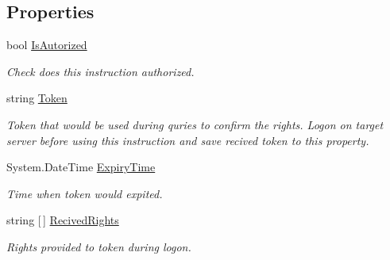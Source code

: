 \subsection*{Properties}
\begin{DoxyCompactItemize}
\item 
bool \mbox{\hyperlink{class_uniform_queries_1_1_executable_1_1_security_1_1_auth_query_processor_ab77106e3aee595bb89634690bec88d9f}{Is\+Autorized}}
\begin{DoxyCompactList}\small\item\em Check does this instruction authorized. \end{DoxyCompactList}\item 
string \mbox{\hyperlink{class_uniform_queries_1_1_executable_1_1_security_1_1_auth_query_processor_aef3e0af13be8f2e30f3ae95a9e8b58bb}{Token}}
\begin{DoxyCompactList}\small\item\em Token that would be used during quries to confirm the rights. Logon on target server before using this instruction and save recived token to this property. \end{DoxyCompactList}\item 
System.\+Date\+Time \mbox{\hyperlink{class_uniform_queries_1_1_executable_1_1_security_1_1_auth_query_processor_a09df0334aa792f2b50d90c107d758af4}{Expiry\+Time}}
\begin{DoxyCompactList}\small\item\em Time when token would expited. \end{DoxyCompactList}\item 
string \mbox{[}$\,$\mbox{]} \mbox{\hyperlink{class_uniform_queries_1_1_executable_1_1_security_1_1_auth_query_processor_a29e80b384acdfe7fccfb713a4ae72140}{Recived\+Rights}}
\begin{DoxyCompactList}\small\item\em Rights provided to token during logon. \end{DoxyCompactList}\end{DoxyCompactItemize}
